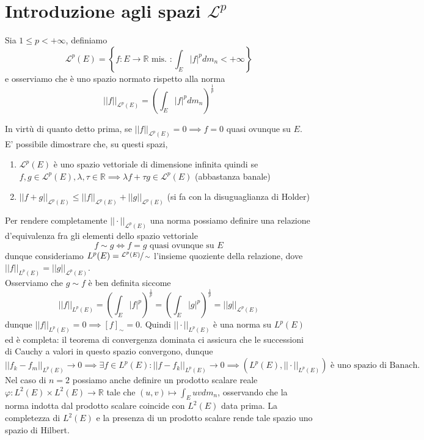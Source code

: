 \section{Introduzione agli spazi $\mathcal{L}^p$}
\begin{definition}
	Sia $1 \leq p < +\infty$, definiamo
	$$
	\mathcal{L}^p(E) = \left\{ f: E \to \mathbb{R} \text{ mis. } : \int_E |f|^p dm_n < +\infty \right\}
	$$
	e osserviamo che è uno spazio normato rispetto alla norma
	$$
	|| f ||_{\mathcal{L}^p(E)} = \left( \int_E |f|^p dm_n \right)^{\frac{1}{p}}
	$$
\end{definition}
In virtù di quanto detto prima, se $|| f ||_{\mathcal{L}^p(E)} = 0 \implies f = 0$ quasi ovunque su $E$. E' possibile dimostrare che, su questi spazi,
\begin{enumerate}[label=\protect\circled{\arabic*}]
	\item $\mathcal{L}^p(E)$ è uno spazio vettoriale di dimensione infinita quindi se $f, g \in \mathcal{L}^p(E), \lambda, \tau \in \mathbb{R} \implies \lambda f + \tau g \in \mathcal{L}^p(E)$ (abbastanza banale)
	\item $|| f + g ||_{\mathcal{L}^p(E)} \leq || f ||_{\mathcal{L}^p(E)} + || g ||_{\mathcal{L}^p(E)}$	(si fa con la disuguaglianza di Holder)
\end{enumerate}
Per rendere completamente $|| \cdot ||_{\mathcal{L}^p(E)}$ una norma possiamo definire una relazione d'equivalenza fra gli elementi dello spazio vettoriale
$$
f \sim g \iff f = g \text{ quasi ovunque su } E
$$
dunque consideriamo $L^p(E) = \sfrac{\mathcal{L}^p(E)}{\sim}$ l'insieme quoziente della relazione, dove $|| f ||_{L^p(E)} = || g ||_{\mathcal{L}^p(E)}$. \\
Osserviamo che $g \sim f$ è ben definita siccome
$$
|| f ||_{L^p(E)} = \left(\int_E |f|^p \right)^{\frac{1}{p}} = \left(\int_E |g|^p \right)^{\frac{1}{p}} = || g ||_{\mathcal{L}^p(E)}
$$
dunque $|| f ||_{L^p(E)} = 0 \implies [f]_{\sim} = 0$. Quindi $|| \cdot ||_{L^p(E)}$ è una norma su $L^p(E)$ ed è completa: il teorema di
convergenza dominata ci assicura che le successioni di Cauchy a valori in questo spazio convergono, dunque
$$
|| f_k - f_m ||_{L^p(E)} \to 0 \implies \exists f \in L^p(E) : || f - f_k ||_{L^p(E)} \to 0 \implies (L^p(E), || \cdot ||_{L^p(E)}) \text{ è uno spazio di Banach}.
$$
Nel caso di $n=2$ possiamo anche definire un prodotto scalare reale $\varphi: L^2(E) \times L^2(E) \to \mathbb{R}$ tale che $(u, v) \mapsto \int_E uv dm_n$, osservando che
la norma indotta dal prodotto scalare coincide con $L^2(E)$ data prima. La completezza di $L^2(E)$ e la presenza di un prodotto scalare rende tale spazio uno spazio di Hilbert.

